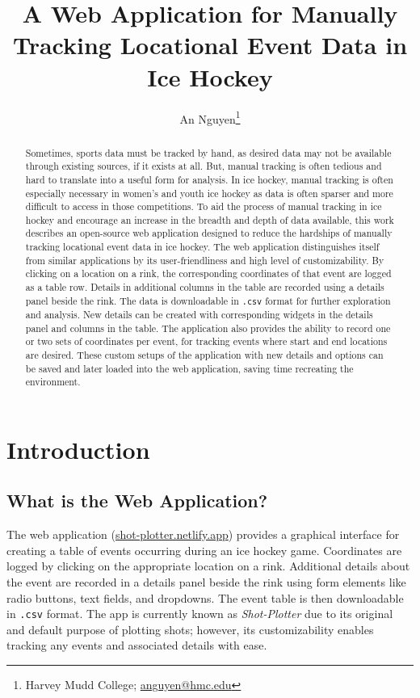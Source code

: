 \documentclass[letterpaper]{article}
\title{A Web Application for Manually Tracking Locational Event Data in Ice Hockey}
\author{An Nguyen\thanks{Harvey Mudd College; \href{mailto:anguyen@hmc.edu}{anguyen@hmc.edu}}}
\date{}
\begin{document}
\maketitle

\begin{abstract}
Sometimes, sports data must be tracked by hand, as desired data may not be available through existing sources, if it exists at all. But, manual tracking is often tedious and hard to translate into a useful form for analysis. In ice hockey, manual tracking is often especially necessary in women’s and youth ice hockey as data is often sparser and more difficult to access in those competitions. To aid the process of manual tracking in ice hockey and encourage an increase in the breadth and depth of data available, this work describes an open-source web application designed to reduce the hardships of manually tracking locational event data in ice hockey. The web application distinguishes itself from similar applications by its user-friendliness and high level of customizability. By clicking on a location on a rink, the corresponding coordinates of that event are logged as a table row. Details in additional columns in the table are recorded using a details panel beside the rink. The data is downloadable in \texttt{.csv} format for further exploration and analysis. New details can be created with corresponding widgets in the details panel and columns in the table. The application also provides the ability to record one or two sets of coordinates per event, for tracking events where start and end locations are desired. These custom setups of the application with new details and options can be saved and later loaded into the web application, saving time recreating the environment.
\end{abstract}

\section{Introduction}
\subsection{What is the Web Application?}
The web application (\href{https://shot-plotter.netlify.app/}{shot-plotter.netlify.app}) provides a graphical interface for creating a table of events occurring during an ice hockey game. Coordinates are logged by clicking on the appropriate location on a rink. Additional details about the event are recorded in a details panel beside the rink using form elements like radio buttons, text fields, and dropdowns. The event table is then downloadable in \texttt{.csv} format. The app is currently known as \textit{Shot-Plotter} due to its original and default purpose of plotting shots; however, its customizability enables tracking any events and associated details with ease.
\end{document}
